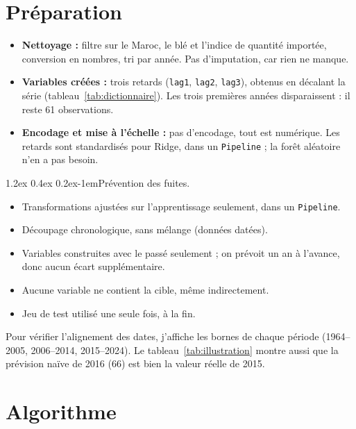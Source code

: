 \documentclass[11pt,a4paper]{article}
\makeatletter
\renewcommand\paragraph{\@startsection{paragraph}{4}{\z@}%
  {1.2ex \@plus 0.4ex \@minus 0.2ex}{-1em}{\normalfont\normalsize\bfseries}}
\makeatother
\begin{document}
\section{Préparation}
\label{sec:preparation}
\begin{itemize}
  \item \textbf{Nettoyage :} filtre sur le Maroc, le blé et l'indice de quantité importée, conversion en nombres, tri par année. Pas d'imputation, car rien ne manque.
  \item \textbf{Variables créées :} trois retards (\texttt{lag1}, \texttt{lag2}, \texttt{lag3}), obtenus en décalant la série (tableau~\ref{tab:dictionnaire}). Les trois premières années disparaissent : il reste 61 observations.
  \item \textbf{Encodage et mise à l'échelle :} pas d'encodage, tout est numérique. Les retards sont standardisés pour Ridge, dans un \texttt{Pipeline} ; la forêt aléatoire n'en a pas besoin.
\end{itemize}

\paragraph{Prévention des fuites.}
\begin{itemize}
  \item[$\boxtimes$] Transformations ajustées sur l'apprentissage seulement, dans un \texttt{Pipeline}.
  \item[$\boxtimes$] Découpage chronologique, sans mélange (données datées).
  \item[$\boxtimes$] Variables construites avec le passé seulement ; on prévoit un an à l'avance, donc aucun écart supplémentaire.
  \item[$\boxtimes$] Aucune variable ne contient la cible, même indirectement.
  \item[$\boxtimes$] Jeu de test utilisé une seule fois, à la fin.
\end{itemize}
Pour vérifier l'alignement des dates, j'affiche les bornes de chaque période (1964--2005, 2006--2014, 2015--2024). Le tableau~\ref{tab:illustration} montre aussi que la prévision naïve de 2016 (66) est bien la valeur réelle de 2015.

\section{Algorithme}
\label{sec:algorithme}
\end{document}
